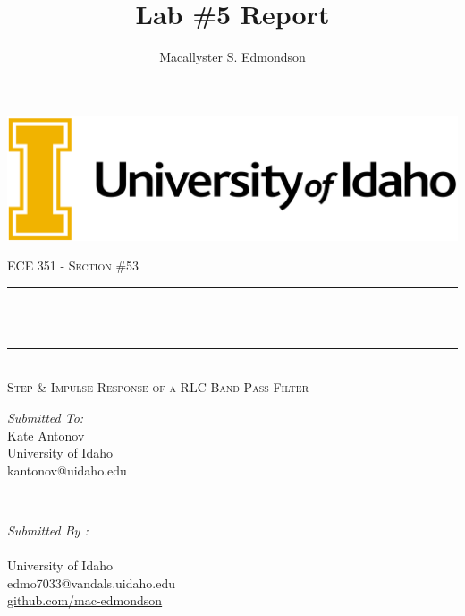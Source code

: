 \documentclass[12pt]{report}
\title{Lab \#5 Report}
\author{Macallyster S. Edmondson}
\date{\longdate\displaydate{date}}
\makeatletter
\let\thetitle\@title
\let\theauthor\@author
\makeatother
\begin{document}
\begin{titlepage}\thispagestyle{titlepage}
\centering
\includegraphics[scale = 0.12]{univ-logo.png}\\[1.0 cm]
\begin{center}    \textsc{\Large   ECE 351 - Section \#53 }\\[2.0 cm]
\end{center}%

\rule{\linewidth}{0.2 mm} \\[0.4 cm]
{ \huge \bfseries \thetitle}\\
\rule{\linewidth}{0.2 mm} \\[0.5 cm]
\textsc{\Large Step \& Impulse Response of a RLC Band Pass Filter }\\[1.5 cm] %
\begin{minipage}{0.4\textwidth}
\begin{flushleft} \large
\emph{Submitted To:}\\
Kate Antonov\\ \small
University of Idaho\\
kantonov@uidaho.edu\\
\hfill
\end{flushleft}
\end{minipage}~
\begin{minipage}{0.4\textwidth}
\begin{flushright} \large
\emph{Submitted By :} \\
\theauthor \\ \small
University of Idaho\\
edmo7033@vandals.uidaho.edu\\
\href{http://github.com/mac-edmondson}{github.com/mac-edmondson}\\
\end{flushright}
\end{minipage}\\[2 cm]
\vfill
\end{titlepage}
\tableofcontents\thispagestyle{customplain}
\pagebreak
\renewcommand{\thesection}{\arabic{section}}
\end{document}
